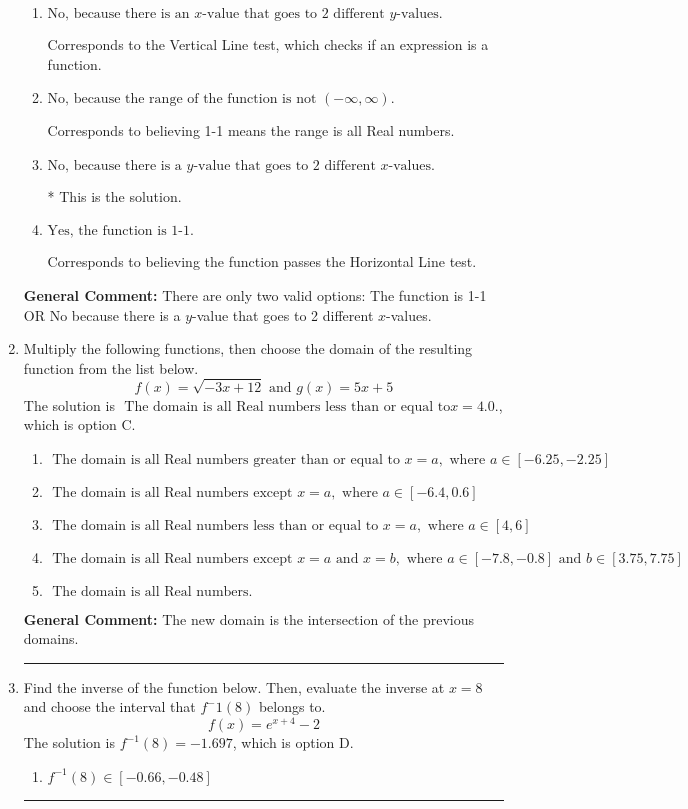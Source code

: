\documentclass{extbook}[14pt]
\newcommand{\litem}[1]{\item #1

\rule{\textwidth}{0.4pt}}
\begin{document}
\begin{enumerate}
{\begin{enumerate}[label=\Alph*.]
Corresponds to believing 1-1 means the domain is all Real numbers.
\item \( \text{No, because there is an $x$-value that goes to 2 different $y$-values.} \)

Corresponds to the Vertical Line test, which checks if an expression is a function.
\item \( \text{No, because the range of the function is not $(-\infty, \infty)$.} \)

Corresponds to believing 1-1 means the range is all Real numbers.
\item \( \text{No, because there is a $y$-value that goes to 2 different $x$-values.} \)

* This is the solution.
\item \( \text{Yes, the function is 1-1.} \)

Corresponds to believing the function passes the Horizontal Line test.
\end{enumerate}

\textbf{General Comment:} There are only two valid options: The function is 1-1 OR No because there is a $y$-value that goes to 2 different $x$-values.
}
\litem{
Multiply the following functions, then choose the domain of the resulting function from the list below.
\[ f(x) = \sqrt{-3x+12}  \text{ and } g(x) = 5x + 5 \]The solution is \( \text{ The domain is all Real numbers less than or equal to} x = 4.0. \), which is option C.\begin{enumerate}[label=\Alph*.]
\item \( \text{ The domain is all Real numbers greater than or equal to } x = a, \text{ where } a \in [-6.25, -2.25] \)


\item \( \text{ The domain is all Real numbers except } x = a, \text{ where } a \in [-6.4, 0.6] \)


\item \( \text{ The domain is all Real numbers less than or equal to } x = a, \text{ where } a \in [4, 6] \)


\item \( \text{ The domain is all Real numbers except } x = a \text{ and } x = b, \text{ where } a \in [-7.8, -0.8] \text{ and } b \in [3.75, 7.75] \)


\item \( \text{ The domain is all Real numbers. } \)


\end{enumerate}

\textbf{General Comment:} The new domain is the intersection of the previous domains.
}
\litem{
Find the inverse of the function below. Then, evaluate the inverse at $x = 8$ and choose the interval that $f^-1(8)$ belongs to.
\[ f(x) = e^{x+4}-2 \]The solution is \( f^{-1}(8) = -1.697 \), which is option D.\begin{enumerate}[label=\Alph*.]
\item \( f^{-1}(8) \in [-0.66, -0.48] \)


\end{enumerate}}
\end{enumerate}
\end{document}
